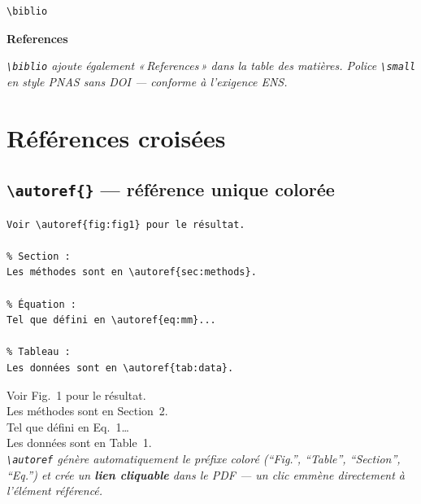 \documentclass[12pt, a4paper]{article}
\renewcommand{\bibfont}{\small}%
\newcommand{\simlink}[1]{\textcolor{ENSorange}{#1}}
\begin{document}
\begin{demo}
\begin{lstlisting}[style=latexcode]
% En fin de document :
\biblio
\end{lstlisting}
\tcblower
\begin{refsection}
\nocite{Vincent2020}
\nocite{Journo2021}
\nocite{Trizac2019}
\nocite{Escarguel2015}
\nocite{Goudemand2019}
{\small\sffamily\bfseries References}\par\nopagebreak\vspace{2pt}
{\renewcommand*{\bibfont}{\tiny}\printbibliography[heading=none]}
\end{refsection}
\smallskip
{\scriptsize\itshape \texttt{\textbackslash biblio} ajoute également
«\,References\,» dans la table des matières.
Police \texttt{\textbackslash small} en style PNAS sans DOI — conforme
à l'exigence ENS.}
\end{demo}

\newpage

\section{Références croisées}
\label{sec:refs}

\subsection[\texttt{\textbackslash autoref} — référence colorée]{\texttt{\textbackslash autoref\{\}} — référence unique colorée}

\begin{demo}
\begin{lstlisting}[style=latexcode]
% Figure :
Voir \autoref{fig:fig1} pour le résultat.

% Section :
Les méthodes sont en \autoref{sec:methods}.

% Équation :
Tel que défini en \autoref{eq:mm}...

% Tableau :
Les données sont en \autoref{tab:data}.
\end{lstlisting}
\tcblower
Voir \simlink{Fig.~1} pour le résultat.\\[4pt]
Les méthodes sont en \simlink{Section~2}.\\[4pt]
Tel que défini en \simlink{Eq.~1}\ldots\\[4pt]
Les données sont en \simlink{Table~1}.\\[8pt]
{\footnotesize\itshape \texttt{\textbackslash autoref} génère automatiquement le préfixe coloré (``Fig.'', ``Table'', ``Section'', ``Eq.'') et crée un \textbf{lien cliquable} dans le PDF — un clic emmène directement à l'élément référencé.}
\end{demo}
\end{document}
